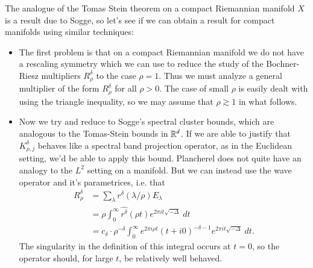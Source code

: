 The analogue of the Tomas Stein theorem on a compact Riemannian manifold $X$ is a result due to Sogge, so let's see if we can obtain a result for compact manifolds using similar techniques:
%
\begin{itemize}
    \item The first problem is that on a compact Riemannian manifold we do not have a rescaling symmetry which we can use to reduce the study of the Bochner-Riesz multipliers $R^\delta_\rho$ to the case $\rho = 1$. Thus we must analyze a general multiplier of the form $R^\delta_\rho$ for all $\rho > 0$. The case of small $\rho$ is easily dealt with using the triangle inequality, so we may assume that $\rho \gtrsim 1$ in what follows.

    \item Now we try and reduce to Sogge's spectral cluster bounds, which are analogous to the Tomas-Stein bounds in $\operatorname{\mathbb{R}}^d$. If we are able to justify that $K^\delta_{\rho,j}$ behaves like a spectral band projection operator, as in the Euclidean setting, we'd be able to apply this bound. Plancherel does not quite have an analogy to the $L^2$ setting on a manifold. But we can instead use the wave operator and it's parametrices, i.e. that
    \begin{align*}
        R^\delta_\rho &= \sum_\lambda r^\delta(\lambda / \rho) E_\lambda\\
        &= \rho \int_0^\infty \widehat{r^\delta}(\rho t) e^{2 \pi i t \sqrt{-\Delta}}\; dt\\
        &= c_\delta \cdot \rho^{-\delta} \int_0^\infty e^{2 \pi i \rho t} (t + i0)^{-\delta - 1} e^{2 \pi i t \sqrt{-\Delta}}\; dt.
    \end{align*}
    The singularity in the definition of this integral occurs at $t = 0$, so the operator should, for large $t$, be relatively well behaved.


\end{itemize}
